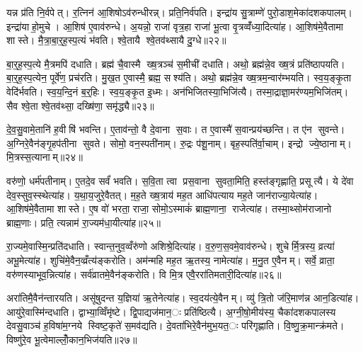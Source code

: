 यन्न प्र॑ति नि॒र्वपेत्। र॒त्निन॑ आ॒शिषोऽव॑रुन्धीरन्न्। प्रति॒निर्व॑पति। इन्द्रा॑य सु॒त्राम्णे॑ पुरो॒डाश॒मेका॑दशकपालम्। इन्द्रा॑याहो॒मुचे। आ॒शिष॑ ए॒वाव॑रुन्धे। अ॒यन्नो॒ राजा॑ वृत्र॒हा राजा॑ भू॒त्वा वृ॒त्रव्वँ॑ध्या॒दित्या॑ह। आ॒शिष॑मे॒वैतामा शास्ते। मै॒त्रा॒बा॒र्॒ह॒स्प॒त्यं भ॑वति। श्वे॒तायै श्वे॒तव॑थ्सायै दु॒ग्धे॥२२॥

बा॒र्॒ह॒स्प॒त्ये मै॒त्रमपि॑ दधाति। ब्रह्म॑ चै॒वास्मै ख्ष॒त्रञ्च॑ स॒मीची॑ दधाति। अथो॒ ब्रह्म॑न्ने॒व ख्ष॒त्रं प्रति॑ष्ठापयति। बा॒र्॒ह॒स्प॒त्येन॒ पूर्वे॑ण॒ प्रच॑रति। मु॒ख॒त ए॒वास्मै॒ ब्रह्म॒ सश्य॑ति। अथो॒ ब्रह्म॑न्ने॒व ख्ष॒त्रम॒न्वार॑म्भयति। स्व॒य॒ङ्कृ॒ता वेदि॑र्भवति। स्व॒य॒न्दि॒नं ब॒र्॒हिः। स्व॒य॒ङ्कृ॒त इ॒ध्मः। अन॑भिजितस्या॒भिजि॑त्यै। तस्मा॒द्राज्ञा॒मर॑ण्यम॒भिजि॑तम्। सैव श्वे॒ता श्वे॒तव॑थ्सा॒ दख्षि॑णा॒ समृ॑द्ध्यै॥२३॥


दे॒व॒सु॒वामे॒तानि॑ ह॒वीषि॑ भवन्ति। ए॒ताव॑न्तो॒ वै दे॒वाना स॒वाः। त ए॒वास्मै॑ स॒वान्प्रय॑च्छन्ति। त ए॑न सुवन्ते। अ॒ग्निरे॒वैन॑ङ्गृ॒हप॑तीना सुवते। सोमो॒ वन॒स्पती॑नाम्। रु॒द्रः प॑शू॒नाम्। बृह॒स्पति॑र्वा॒चाम्। इन्द्रो ज्ये॒ष्ठानाम्। मि॒त्रस्स॒त्यानाम्॥२४॥

वरु॑णो॒ धर्म॑पतीनाम्। ए॒तदे॒व सर्वं॑ भवति। स॒वि॒ता त्वा प्रस॒वाना सुवता॒मिति॒ हस्त॑ङ्गृह्णाति॒ प्रसूत्यै। ये दे॑वा देव॒स्सुव॒स्स्थेत्या॑ह। य॒था॒य॒जुरे॒वैतत्। म॒ह॒ते ख्ष॒त्राय॑ मह॒त आधि॑पत्याय मह॒ते जान॑राज्या॒येत्या॑ह। आ॒शिष॑मे॒वैतामा शास्ते। ए॒ष वो॑ भरता॒ राजा॒ सोमो॒ऽस्माकं॑ ब्राह्म॒णाना॒ राजेत्या॑ह। तस्मा॒थ्सोम॑राजानो ब्राह्म॒णाः। प्रति॒ त्यन्नाम॑ रा॒ज्यम॑धा॒यीत्या॑ह॥२५॥

रा॒ज्यमे॒वास्मि॒न्प्रति॑दधाति। स्वान्त॒नुव॒व्वँरु॑णो अशिश्रे॒दित्या॑ह। व॒रु॒ण॒स॒वमे॒वाव॑रुन्धे। शुचेर्मि॒त्रस्य॒ व्रत्या॑ अभू॒मेत्या॑ह। शुचि॑मे॒वैन॒व्व्रँत्य॑ङ्करोति। अम॑न्महि मह॒त ऋ॒तस्य॒ नामेत्या॑ह। म॒नु॒त ए॒वैनम्। सर्वे॒ व्राता॒ वरु॑णस्याभूव॒न्नित्या॑ह। सर्व॑व्रातमे॒वैन॑ङ्करोति। वि मि॒त्र एवै॒ररा॑तिमतारी॒दित्या॑ह॥२६॥

अरा॑तिमै॒वैन॑न्तारयति। असू॑षुदन्त य॒ज्ञिया॑ ऋ॒तेनेत्या॑ह। स्व॒दय॑त्ये॒वैनम्। व्यु॑ त्रि॒तो ज॑रि॒माण॑न्न आन॒डित्या॑ह। आयु॑रे॒वास्मि॑न्दधाति। द्वाभ्या॒व्विँमृ॑ष्टे। द्वि॒पाद्यज॑मान॒ः प्रति॑ष्ठित्यै। अ॒ग्नी॒षो॒मीय॑स्य॒ चैका॑दशकपालस्य देवसु॒वाञ्च॑ ह॒विषा॑म॒ग्नये स्विष्ट॒कृते॑ स॒मव॑द्यति। दे॒वता॑भिरे॒वैन॑मुभ॒यत॒ः परि॑गृह्णाति। वि॒ष्णु॒क्र॒मान्क्र॑मते। विष्णु॑रे॒व भू॒त्वेमाल्लोँ॒कान॒भिज॑यति॥२७॥


